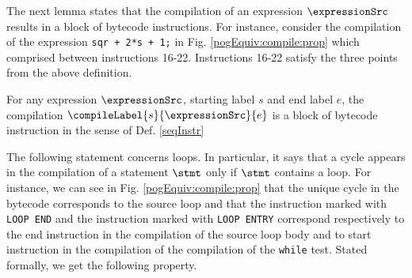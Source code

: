 The next lemma states that the compilation of an expression $\expressionSrc$ results in
 a block of bytecode instructions.  For instance, consider the compilation of the expression \lstinline!sqr + 2*s + 1;! in Fig. \ref{pogEquiv:compile:prop}  
which comprised between instructions 16-22. Instructions  16-22 satisfy the three points from the above definition.
\begin{compProp}\label{compile:prop:compProp3}
    For any expression $\expressionSrc$, starting label $s$ and end label $e$,
    the compilation $\compileLabel{s}{\expressionSrc}{e}$ is a block of bytecode instruction in the sense of Def. \ref{seqInstr}
   
\end{compProp}


The following statement concerns  loops. In particular, it says  that a cycle appears in the compilation of a statement  $\stmt$  only if $\stmt$ contains a loop.
For instance, we can  see in Fig. \ref{pogEquiv:compile:prop} that the unique cycle in the bytecode corresponds to the source loop and that the 
instruction marked with \lstinline!LOOP END! and the instruction marked with \lstinline!LOOP ENTRY! correspond respectively to the end instruction   in the 
compilation of the source loop body   and to start instruction in the compilation of the compilation of the \lstinline!while! test. 
Stated formally, we get the following property. 

